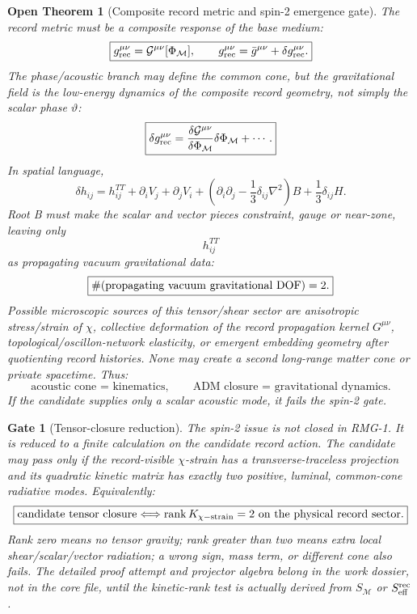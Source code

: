 \documentclass[11pt]{article}
\newtheorem{openthm}{Open Theorem}
\newtheorem{gate}{Gate}
\begin{document}
\begin{openthm}[Composite record metric and spin-2 emergence gate]
The record metric must be a composite response of the base medium:
\[
\boxed{
g_{\rm rec}^{\mu\nu}
=
{\cal G}^{\mu\nu}[\Phi_{\mathcal M}],
\qquad
g_{\rm rec}^{\mu\nu}
=
\bar g^{\mu\nu}+\delta g_{\rm rec}^{\mu\nu}.
}
\]
The phase/acoustic branch may define the common cone, but the gravitational
field is the low-energy dynamics of the composite record geometry, not simply
the scalar phase \(\vartheta\):
\[
\boxed{
\delta g_{\rm rec}^{\mu\nu}
=
\frac{\delta{\cal G}^{\mu\nu}}{\delta\Phi_{\mathcal M}}
\delta\Phi_{\mathcal M}
+\cdots.
}
\]
In spatial language,
\[
\boxed{
\delta h_{ij}
=
h_{ij}^{TT}
+\partial_iV_j+\partial_jV_i
+\left(\partial_i\partial_j-\frac13\delta_{ij}\nabla^2\right)B
+\frac13\delta_{ij}H.
}
\]
Root B must make the scalar and vector pieces constraint, gauge or near-zone,
leaving only
\[
\boxed{
h_{ij}^{TT}
}
\]
as propagating vacuum gravitational data:
\[
\boxed{
\#({\rm propagating\ vacuum\ gravitational\ DOF})=2.
}
\]
Possible microscopic sources of this tensor/shear sector are anisotropic
stress/strain of \(\chi\), collective deformation of the record propagation
kernel \(G^{\mu\nu}\), topological/oscillon-network elasticity, or emergent
embedding geometry after quotienting record histories.  None may create a
second long-range matter cone or private spacetime.  Thus:
\[
\boxed{
\text{acoustic cone = kinematics},
\qquad
\text{ADM closure = gravitational dynamics}.
}
\]
If the candidate supplies only a scalar acoustic mode, it fails the spin-2
gate.
\end{openthm}

\begin{gate}[Tensor-closure reduction]
The spin-2 issue is not closed in RMG-1.  It is reduced to a finite
calculation on the candidate record action.  The candidate may pass only if the
record-visible \(\chi\)-strain has a transverse-traceless projection and its
quadratic kinetic matrix has exactly two positive, luminal, common-cone
radiative modes.  Equivalently:
\[
\boxed{
\text{candidate tensor closure}
\Longleftrightarrow
\mathrm{rank}\,K_{\chi{\rm -strain}}=2
\text{ on the physical record sector}.
}
\]
Rank zero means no tensor gravity; rank greater than two means extra local
shear/scalar/vector radiation; a wrong sign, mass term, or different cone also
fails.  The detailed proof attempt and projector algebra belong in the work
dossier, not in the core file, until the kinetic-rank test is actually
derived from \(S_{\mathcal M}\) or \(S_{\rm eff}^{\rm rec}\).
\end{gate}
\end{document}
